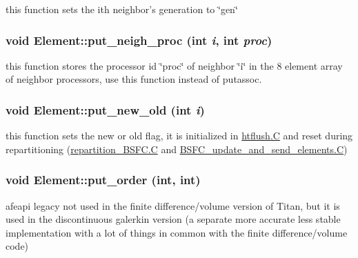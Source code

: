 this function sets the ith neighbor's generation to \char`\"{}gen\char`\"{} 

\hypertarget{classElement_a19}{
\subsubsection[put\_\-neigh\_\-proc]{\setlength{\rightskip}{0pt plus 5cm}void Element::put\_\-neigh\_\-proc (int {\em i}, int {\em proc})}}
\label{classElement_a19}


this function stores the processor id \char`\"{}proc\char`\"{} of neighbor \char`\"{}i\char`\"{} in the 8 element array of neighbor processors, use this function instead of putassoc. 

\hypertarget{classElement_a47}{
\subsubsection[put\_\-new\_\-old]{\setlength{\rightskip}{0pt plus 5cm}void Element::put\_\-new\_\-old (int {\em i})}}
\label{classElement_a47}


this function sets the new or old flag, it is initialized in \hyperlink{constant_8h_a21}{htflush.C} and reset during repartitioning (\hyperlink{constant_8h_a21}{repartition\_\-BSFC.C} and \hyperlink{constant_8h_a21}{BSFC\_\-update\_\-and\_\-send\_\-elements.C}) 

\hypertarget{classElement_a20}{
\subsubsection[put\_\-order]{\setlength{\rightskip}{0pt plus 5cm}void Element::put\_\-order (int, int)}}
\label{classElement_a20}


afeapi legacy not used in the finite difference/volume version of Titan, but it is used in the discontinuous galerkin version (a separate more accurate less stable implementation with a lot of things in common with the finite difference/volume code) 


